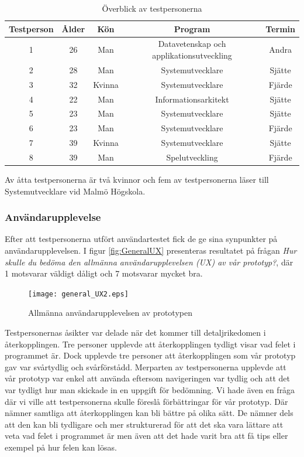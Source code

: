 \documentclass[a4paper,11pt]{article}
\begin{document}
{\begin{table}[h!]
	\centering
	\caption{Överblick av testpersonerna}
	\label{tab:Testpersoner}
	\begin{tabular}{c c c c c}
		\toprule
		Testperson & Ålder & Kön & Program & Termin\\
		\midrule
		1 & 26 & Man & Datavetenskap och applikationsutveckling & Andra\\
		2 & 28 & Man & Systemutvecklare & Sjätte\\
		3 & 32 & Kvinna & Systemutvecklare & Fjärde\\
		4 & 22 & Man & Informationsarkitekt & Sjätte\\
		5 & 23 & Man & Systemutvecklare & Sjätte\\
		6 & 23 & Man & Systemutvecklare & Fjärde\\
		7 & 39 & Kvinna & Systemutvecklare & Sjätte\\
		8 & 39 & Man & Spelutveckling & Fjärde\\
		\bottomrule
	\end{tabular}
\end{table}
Av åtta testpersonerna är två kvinnor och fem av testpersonerna läser till Systemutvecklare vid Malmö Högskola.

\subsubsection{Användarupplevelse}\label{Användarupplevelse}
Efter att testpersonerna utfört användartestet fick de ge sina synpunkter på användarupplevelsen. I figur \ref{fig:GeneralUX} presenteras resultatet på frågan \textit{Hur skulle du bedöma den allmänna användarupplevelsen (UX) av vår prototyp?}, där 1 motsvarar väldigt dåligt och 7 motsvarar mycket bra.

\begin{figure}[ht!]
\centering
\texttt{[image: general\_UX2.eps]}
\caption{Allmänna användarupplevelsen av prototypen}
\label{fig:GeneralUX2}
\end{figure}

Testpersonernas åsikter var delade när det kommer till detaljrikedomen i återkopplingen. Tre personer upplevde att återkopplingen tydligt visar vad felet i programmet är. Dock upplevde tre personer att återkopplingen som vår prototyp gav var svårtydlig och svårförstådd. Merparten av testpersonerna upplevde att vår prototyp var enkel att använda eftersom navigeringen var tydlig och att det var tydligt hur man skickade in en uppgift för bedömning. 
Vi hade även en fråga där vi ville att testpersonerna skulle föreslå förbättringar för vår prototyp. Där nämner samtliga att återkopplingen kan bli bättre på olika sätt. De nämner dels att den kan bli tydligare och mer strukturerad för att det ska vara lättare att veta vad felet i programmet är men även att det hade varit bra att få tips eller exempel på hur felen kan lösas. 

}
\end{document}
